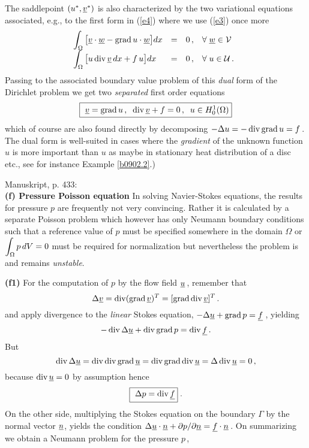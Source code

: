 \documentclass[12pt,a4paper,USenglish,twoside]{book}
\begin{document}
\begin{example}
\begin{equation}
\end{equation}
The saddlepoint $(u^*,\v^*)$ is also characterized by the two variational equations
associated, e.g., to the first form in (\ref{e4}) where we use (\ref{e3}) once more
\[
\ba{.}{llll}
\dis \int_{\Omega}\big[ \v\cdot \w -  \grad u \cdot \w \big] dx &=& 0\,,&
\forall \; \w \in \V\\[1ex]
\dis \int_{\Omega}\big[ u \div  \v \,dx + f\,u\big]dx  &=& 0\,, &
\forall \; u \in \U\,.
\ea{.}
\]
Passing to the associated boundary value problem of this {\em dual} form of the {\sc 
Dirichlet} problem we get two {\em separated} first order equations
%
\begin{equation}\label{e6}
\fbox{$\
\v = \grad u\,, \;\; \div \v + f = 0\,,\;\; u \in H^1_0(\Omega)
$}
\end{equation}
which of course are also found directly by decomposing $- \Delta u = - \div \grad u = 
f$\,. The dual form is well-suited in cases where the {\em gradient} of the unknown 
function $u$ is more important than $u$ as maybe in stationary heat distribution of 
a disc etc., see for instance Example \ref{b0902.2}.)
\end{example}
\par
Manuskript, p. 433:\\
{\bf (f) Pressure Poisson equation}
In solving {\sc Navier-Stokes} equations, the results for pressure $p$ are 
frequently not very convincing. Rather it is calculated by a separate
{\sc Poisson} problem which however has only {\sc Neumann} boundary conditions
such that a reference value of $p$ must be specified somewhere in the domain
$\Omega$ or $\dis \int_{\Omega}p\, dV = 0$ must be required for
normalization but nevertheless the problem is and remains {\em unstable}.
\par
{\bf (f1)} For the computation of  $p$ by the flow field $\u$\,,
remember that
\[
\Delta \v = \div (\grad \v)^T = [\grad \div \v]^T\,.
\]
and apply divergence to the {\em linear} {\sc Stokes} equation,
$- \Delta \u + \grad p = \f\,$, yielding
\enlargethispage{6ex}
\[
- \div \Delta \u + \div \grad p = \div \f\,.
\]
But
\[
\div \Delta \u = \div \div \grad \u = \div \grad \div \u
= \Delta \div \u = 0\,,
\]
because $\div \u = 0$ by assumption hence
\[
\fbox{$\
\Delta p = \div \f
$} \; .
\]
On the other side, multiplying the {\sc Stokes} equation on the boundary $\Gamma$ by the 
normal vector $\n$, yields the condition
$
\Delta \u \cdot \n + \da p/\da \n = \f \cdot \n
$\,.
On summarizing we obtain a {\sc Neumann} problem for the pressure $p$\,,
\end{document}
